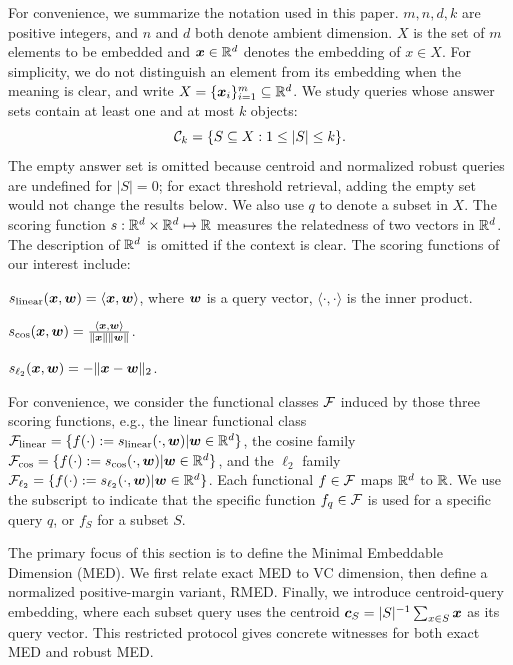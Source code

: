 \documentclass{article}
\begin{document}
For convenience, we summarize the notation used in this paper.
$m, n, d, k$ are positive integers, and $n$ and $d$ both denote ambient dimension. $X$ is the set of $m$ elements to be embedded and $\bm{x} \in \mathbb{R}^d$ denotes the embedding of $x\in X$. For simplicity, we do not distinguish an element from its embedding when the meaning is clear, and write $X = \{\bm{x}_i\}_{i=1}^m \subseteq \mathbb{R}^d$.
We study queries whose answer sets contain at least one and at most $k$ objects:
\[
    \mathcal{C}_k=\{S\subseteq X: 1\leq |S|\leq k\}.
\]
The empty answer set is omitted because centroid and normalized robust queries are undefined for $|S|=0$; for exact threshold retrieval, adding the empty set would not change the results below. We also use $q$ to denote a subset in $X$.
The scoring function $s: \mathbb{R}^d \times \mathbb{R}^d\mapsto \mathbb{R}$ measures the relatedness of two vectors in $\mathbb{R}^d$. The description of $\mathbb{R}^d$ is omitted if the context is clear. The scoring functions of our interest include:
\begin{compactdesc}
    \item[Linear:] $s_{\rm linear}(\bm{x}, \bm{w}) = \langle \bm{x}, \bm{w}\rangle$, where $\bm{w}$ is a query vector, $\langle \cdot, \cdot\rangle$ is the inner product.
    \item[Cosine similarity:] $s_{\cos}(\bm{x}, \bm{w}) = \frac{\langle \bm{x}, \bm{w} \rangle }{ \|\bm{x}\|\|\bm{w}\|}$.
    \item[Euclidean distance ($\ell_2$):] $s_{\ell_2}(\bm{x}, \bm{w}) = - \|\bm{x} - \bm{w}\|_2 $.
\end{compactdesc}
For convenience, we consider the functional classes $\mathcal{F}$ induced by those three scoring functions, e.g., the linear functional class $\mathcal{F}_{\rm linear} = \{f(\cdot ):= s_{\rm linear}(\cdot, \bm{w}) | \bm{w} \in \mathbb{R}^d\}$, the cosine family $\mathcal{F}_{\cos} = \{  f(\cdot ):= s_{\cos}(\cdot, \bm{w}) | \bm{w} \in \mathbb{R}^d\}$, and the $\ell_2$ family $\mathcal{F}_{\ell_{2}} = \{f(\cdot ):= s_{\ell_2}(\cdot, \bm{w}) | \bm{w} \in \mathbb{R}^d\}$. Each functional $f\in \mathcal{F}$ maps $\mathbb{R}^d$ to $\mathbb{R}$. We use the subscript to indicate that the specific function $f_q\in \mathcal{F}$ is used for a specific query $q$, or $f_S$ for a subset $S$.



The primary focus of this section is to define the Minimal Embeddable Dimension (MED). We first relate exact MED to VC dimension, then define a normalized positive-margin variant, RMED. Finally, we introduce centroid-query embedding, where each subset query uses the centroid $\bm{c}_S = |S|^{-1}\sum_{x\in S}\bm{x}$ as its query vector. This restricted protocol gives concrete witnesses for both exact MED and robust MED.
\end{document}
